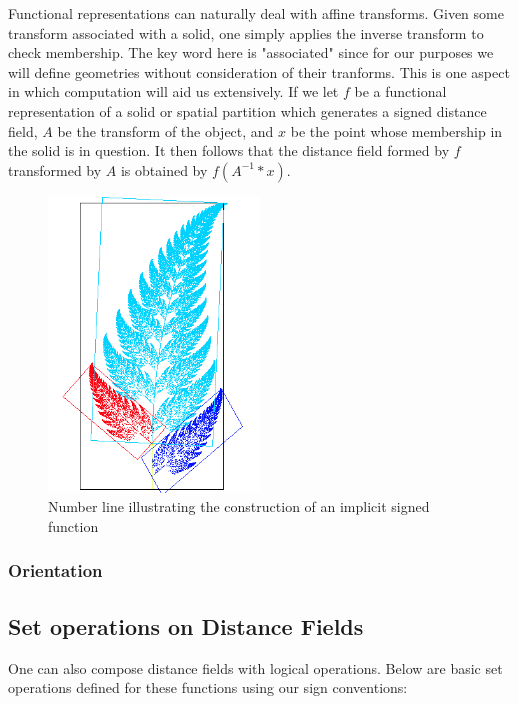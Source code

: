 Functional representations can naturally deal with affine
transforms\cite{Henderson_2002}. Given some transform associated with a
solid, one simply applies the inverse transform to check membership.
The key word here is "associated" since for our purposes we will define
geometries without consideration of their tranforms. This is one aspect
in which computation will aid us extensively. If we let $f$ be a functional
representation of a solid or spatial partition
which generates a signed distance field, $A$ be the transform of the object,
and $x$ be the point whose membership in the solid is in question. It then
follows that the distance field formed by $f$ transformed by $A$ is obtained
by $f(A^{-1}*x)$.

\begin{figure}[h!]
  \centering
    \includegraphics[width=0.5\textwidth]{img/Fractal_fern_explained.png}
  \caption{Number line illustrating the construction of an implicit signed function}
  \label{fig:implicit-sketch}
\end{figure}


\subsubsection{Orientation}


\subsection{Set operations on Distance Fields}


One can also compose distance fields with logical operations. 
Below are basic set operations defined for these functions using our
sign conventions:

